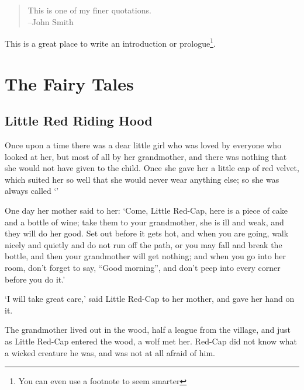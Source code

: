 \documentclass[oneside,11pt]{memoir} %
\begin{document}
\begin{quote}
This is one of my finer quotations.\\
--John Smith
\end{quote}

This is a great place to write an introduction or prologue\footnote{You can even use a footnote to seem smarter}.


\part{The Fairy Tales}


\chapter{Little Red Riding Hood}

Once upon a time there was a dear little girl who was loved by everyone who looked at her, but most of all by her grandmother, and there was nothing that she would not have given to the child. Once she gave her a little cap of red velvet, which suited her so well that she would never wear anything else; so she was always called `'

One day her mother said to her: `Come, Little Red-Cap, here is a piece of cake and a bottle of wine; take them to your grandmother, she is ill and weak, and they will do her good. Set out before it gets hot, and when you are going, walk nicely and quietly and do not run off the path, or you may fall and break the bottle, and then your grandmother will get nothing; and when you go into her room, don't forget to say, ``Good morning'', and don't peep into every corner before you do it.'

`I will take great care,' said Little Red-Cap to her mother, and gave her hand on it.

The grandmother lived out in the wood, half a league from the village, and just as Little Red-Cap entered the wood, a wolf met her. Red-Cap did not know what a wicked creature he was, and was not at all afraid of him.
\end{document}
